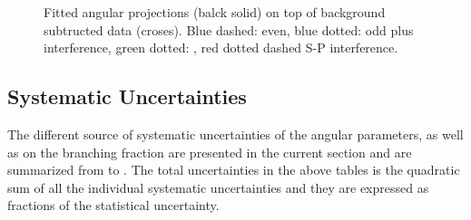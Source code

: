 \begin{figure}[!h]
  \begin{subfigure}{\textwidth}
    \centering
    \scalebox{1.45}{}
    \label{angPlot_ctk}
  \end{subfigure}
  \begin{subfigure}{\textwidth}
    \centering
    \scalebox{1.45}{}
    \label{angPlot_ctl}
  \end{subfigure}
  \begin{subfigure}{\textwidth}
    \centering
    \scalebox{1.45}{}
    \label{angPlot_phi}
  \end{subfigure}
  \caption{Fitted angular \pdf projections (balck solid) on top of \BsJpsiKst background subtructed data (croses).
           Blue dashed: \pwave even, blue dotted: \pwave odd plus interference,
           green dotted: \swave, red dotted dashed S-P interference.}
  \label{angular_plot}
\end{figure}


\subsection{Systematic Uncertainties}
\label{systemics}
The different source of systematic uncertainties of the \Bs angular parameters, as well as on the branching fraction
are presented in the current section and are summarized from  to .
The total uncertainties in the above tables is the quadratic sum of all the individual systematic uncertainties and
they are expressed as fractions of the statistical uncertainty.

